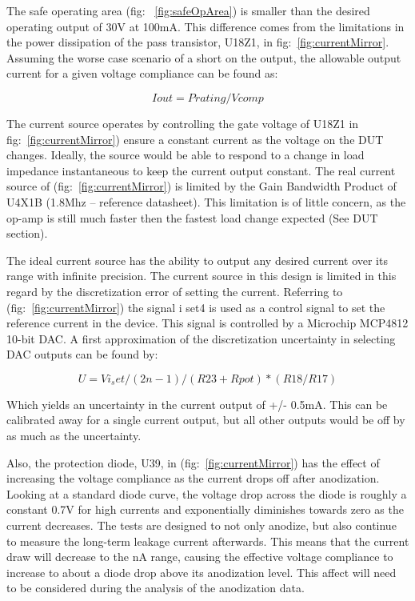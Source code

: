 \documentclass[journal]{IEEEtran}
\begin{document}
The safe operating area (fig: ~\ref{fig:safeOpArea}) is smaller than the desired operating output of 30V at 100mA. This difference comes from the limitations in the power dissipation of the pass transistor, U18Z1, in fig:~\ref{fig:currentMirror}. Assuming the worse case scenario of a short on the output, the allowable output current for a given voltage compliance can be found as:

\begin{equation}
Iout = Prating / Vcomp
\end{equation}

The current source operates by controlling the gate voltage of U18Z1 in fig:~\ref{fig:currentMirror}) ensure a constant current as the voltage on the DUT changes. Ideally, the source would be able to respond to a change in load impedance instantaneous to keep the current output constant. The real current source of (fig:~\ref{fig:currentMirror}) is limited by the Gain Bandwidth Product of U4X1B (1.8Mhz – reference datasheet). This limitation is of little concern, as the op-amp is still much faster then the fastest load change expected (See DUT section).

The ideal current source has the ability to output any desired current over its range with infinite precision. The current source in this design is limited in this regard by the discretization error of setting the current. Referring to (fig:~\ref{fig:currentMirror}) the signal i set4 is used as a control signal to set the reference current in the device. This signal is controlled by a Microchip MCP4812 10-bit DAC. A first approximation of the discretization uncertainty in selecting DAC outputs can be found by:


\begin{equation}
U = Vi_set /(2n-1) / (R23 + Rpot) *(R18/R17)
\end{equation}

Which yields an uncertainty in the current output of +/- 0.5mA. This can be calibrated away for a single current output, but all other outputs would be off by as much as the uncertainty.

Also, the protection diode, U39, in (fig:~\ref{fig:currentMirror}) has the effect of increasing the voltage compliance as the current drops off after anodization. Looking at a standard diode curve, the voltage drop across the diode is roughly a constant 0.7V for high currents and exponentially diminishes towards zero as the current decreases. The tests are designed to not only anodize, but also continue to measure the long-term leakage current afterwards. This means that the current draw will decrease to the nA range, causing the effective voltage compliance to increase to about a diode drop above its anodization level. This affect will need to be considered during the analysis of the anodization data.
\end{document}
